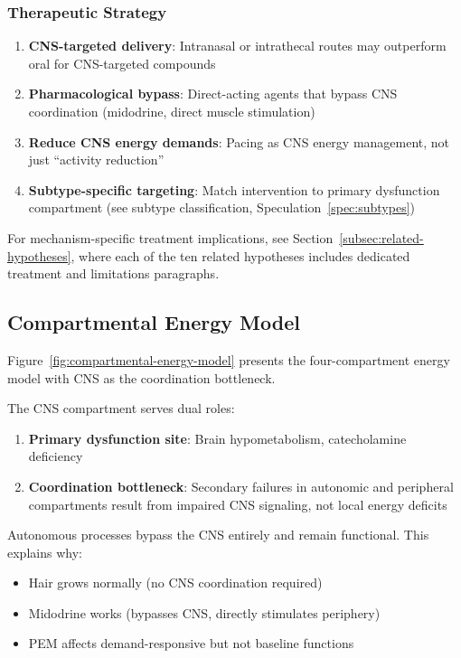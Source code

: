 \subsubsection{Therapeutic Strategy}

\begin{keypoint}
\begin{enumerate}
    \item \textbf{CNS-targeted delivery}: Intranasal or intrathecal routes may outperform oral for CNS-targeted compounds
    \item \textbf{Pharmacological bypass}: Direct-acting agents that bypass CNS coordination (midodrine, direct muscle stimulation)
    \item \textbf{Reduce CNS energy demands}: Pacing as CNS energy management, not just ``activity reduction''
    \item \textbf{Subtype-specific targeting}: Match intervention to primary dysfunction compartment (see subtype classification, Speculation~\ref{spec:subtypes})
\end{enumerate}
\end{keypoint}

For mechanism-specific treatment implications, see Section~\ref{subsec:related-hypotheses}, where each of the ten related hypotheses includes dedicated treatment and limitations paragraphs.


\subsection{Compartmental Energy Model}

Figure~\ref{fig:compartmental-energy-model} presents the four-compartment energy model with CNS as the coordination bottleneck.



\begin{keypoint}
The CNS compartment serves dual roles:
\begin{enumerate}
    \item \textbf{Primary dysfunction site}: Brain hypometabolism, catecholamine deficiency
    \item \textbf{Coordination bottleneck}: Secondary failures in autonomic and peripheral compartments result from impaired CNS signaling, not local energy deficits
\end{enumerate}

Autonomous processes bypass the CNS entirely and remain functional. This explains why:
\begin{itemize}
    \item Hair grows normally (no CNS coordination required)
    \item Midodrine works (bypasses CNS, directly stimulates periphery)
    \item PEM affects demand-responsive but not baseline functions
\end{itemize}
\end{keypoint}


